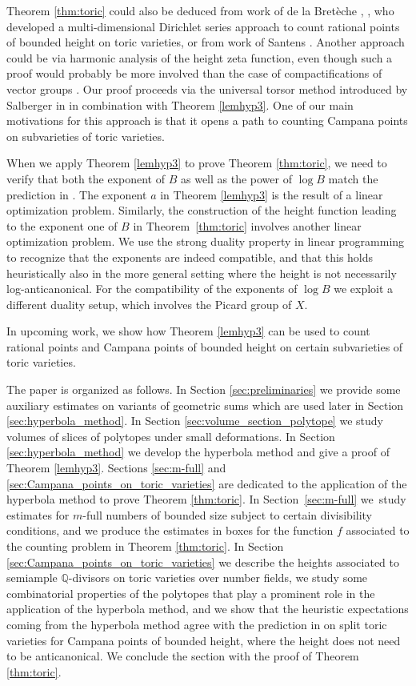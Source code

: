 \documentclass[JEP,XML,SOM,Unicode,published]{cedram}
\newcommand\QQ{\mathbb{Q}}
\theoremstyle{definition}
\numberwithin{theorem}{section}
\begin{document}
Theorem \ref{thm:toric} could also be deduced from work of de la Bretèche \cite{Bre01a}, \cite{Bre01b}, who developed a multi-dimensional Dirichlet series approach to count rational points of bounded height on toric varieties, or from work of Santens \cite{Santens}. Another approach could be via harmonic analysis of the height zeta function, even though such a proof would probably be more involved than the case of compactifications of vector groups \cite{PSTVA}.
Our proof proceeds via the universal torsor method introduced by Salberger in \cite{MR1679841} in combination with Theorem \ref{lemhyp3}.
One of our main motivations for this approach is that it opens a path to counting Campana points on subvarieties of toric varieties.\par
When we apply Theorem \ref{lemhyp3} to prove Theorem \ref{thm:toric}, we need to verify that both the exponent of $B$ as well as the power of $\log B$ match the prediction in \cite{PSTVA}. The exponent $a$ in Theorem \ref{lemhyp3} is the result of a linear optimization problem. Similarly, the construction of the height function leading to the exponent one of $B$ in Theorem~\ref{thm:toric} involves another linear optimization problem. We use the strong duality property in linear programming \cite[Ch.\,6]{Dantzig} to recognize that the exponents
are indeed compatible, and that this holds heuristically also in the more general setting where the height is not necessarily log-anticanonical. For the compatibility of the exponents of $\log B$ we exploit a different duality setup, which involves the Picard group of $X$.

In upcoming work, we show how Theorem \ref{lemhyp3} can be used to count rational points and Campana points of bounded height on certain subvarieties of toric varieties.

The paper is organized as follows.
In Section \ref{sec:preliminaries} we provide some auxiliary estimates on variants of geometric sums which are used later in Section \ref{sec:hyperbola_method}.
In Section \ref{sec:volume_section_polytope} we study volumes of slices of polytopes under small deformations.
In Section \ref{sec:hyperbola_method} we develop the hyperbola method and give a proof of Theorem \ref{lemhyp3}.
Sections \ref{sec:m-full} and \ref{sec:Campana_points_on_toric_varieties} are dedicated to the application of the hyperbola method to prove Theorem \ref{thm:toric}.
In Section~\ref{sec:m-full} we~study estimates for $m$-full numbers of bounded size subject to certain divisibility conditions, and we produce the estimates in boxes for the function $f$ associated to the counting problem in Theorem \ref{thm:toric}.
In Section \ref{sec:Campana_points_on_toric_varieties} we describe the heights associated to semiample $\QQ$-divisors on toric varieties over number fields, we study some combinatorial properties of the polytopes that play a prominent role in the application of the hyperbola method, and we show that the heuristic expectations coming from the hyperbola method agree with the prediction in \cite[Conj.\,1.1]{PSTVA} on split toric varieties for Campana points of bounded height, where the height does not need to be anticanonical. We conclude the section with the proof of Theorem \ref{thm:toric}.\par
\end{document}
